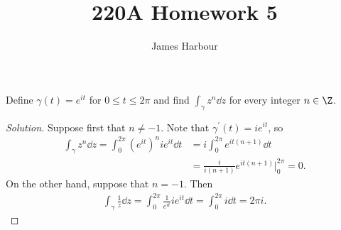 \documentclass[12pt]{article}
\title{220A Homework 5}
\author{James Harbour}
\begin{document}
\maketitle


\begin{homeworkProblem}
  Define $ \gamma(t) = e^{it} $ for $ 0\leq t\leq 2\pi $ and find $ \int_{\gamma} z^{n}\dd{z} $ for every integer $ n\in \Z $.

  \begin{proof}[Solution]
    Suppose first that $ n\neq -1 $.
    Note that $ \gamma^{\prime}(t) = ie^{it} $, so 
    \begin{align*}
      \int_{\gamma} z^{n} \dd{z} = \int_{0}^{2\pi} (e^{it})^{n} ie^{it}\dd{t} &= i\int_{0}^{2\pi}e^{it(n+1)} \dd{t} \\
      &=\frac{i}{i(n+1)}e^{it(n+1)}\bigg\rvert_{0}^{2\pi} = 0.
    \end{align*}
    On the other hand, suppose that $ n=-1 $. Then 
    \begin{align*}
      \int_{\gamma}\frac{1}{z}\dd{z} = \int_{0}^{2\pi} \frac{1}{e^{it}}ie^{it} \dd{t} = \int_{0}^{2\pi} i \dd{t} = 2\pi i.
    \end{align*}
  \end{proof}
\end{homeworkProblem}
\end{document}
